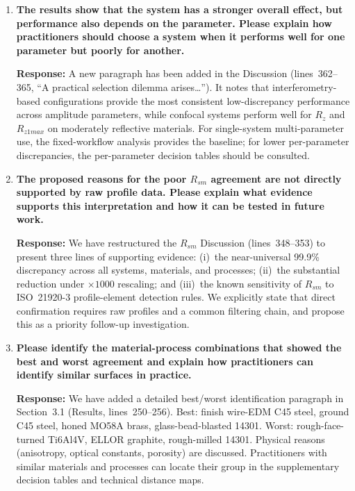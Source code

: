 \documentclass[10pt]{article}
\begin{document}
\begin{enumerate}[leftmargin=*, label=\textbf{Comment \arabic*.}, ref=\arabic*]
\textbf{Response:} We have expanded the transfer-analysis paragraph in the Discussion (lines~360--365). Amplitude parameters show smaller transfer penalties for C45 steel across machining processes and for ground surfaces generally. $R_a$ and $R_q$ show systematically larger transfer penalties than $R_t$ and $R_z$, indicating greater sensitivity to material--process context. Cross-material transfer penalties are systematically larger than cross-process penalties within the same material.

\item \textbf{The results show that the system has a stronger overall effect, but performance also depends on the parameter. Please explain how practitioners should choose a system when it performs well for one parameter but poorly for another.}

\textbf{Response:} A new paragraph has been added in the Discussion (lines~362--365, ``A practical selection dilemma arises\ldots''). It notes that interferometry-based configurations provide the most consistent low-discrepancy performance across amplitude parameters, while confocal systems perform well for $R_z$ and $R_{z1max}$ on moderately reflective materials. For single-system multi-parameter use, the fixed-workflow analysis provides the baseline; for lower per-parameter discrepancies, the per-parameter decision tables should be consulted.

\item \textbf{The proposed reasons for the poor $R_{sm}$ agreement are not directly supported by raw profile data. Please explain what evidence supports this interpretation and how it can be tested in future work.}

\textbf{Response:} We have restructured the $R_{sm}$ Discussion (lines~348--353) to present three lines of supporting evidence: (i)~the near-universal 99.9\% discrepancy across all systems, materials, and processes; (ii)~the substantial reduction under $\times 1000$ rescaling; and (iii)~the known sensitivity of $R_{sm}$ to ISO~21920-3 profile-element detection rules. We explicitly state that direct confirmation requires raw profiles and a common filtering chain, and propose this as a priority follow-up investigation.

\item \textbf{Please identify the material-process combinations that showed the best and worst agreement and explain how practitioners can identify similar surfaces in practice.}

\textbf{Response:} We have added a detailed best/worst identification paragraph in Section~3.1 (Results, lines~250--256). Best: finish wire-EDM C45 steel, ground C45 steel, honed MO58A brass, glass-bead-blasted 14301. Worst: rough-face-turned Ti6Al4V, ELLOR graphite, rough-milled 14301. Physical reasons (anisotropy, optical constants, porosity) are discussed. Practitioners with similar materials and processes can locate their group in the supplementary decision tables and technical distance maps.


\end{enumerate}
\end{document}

